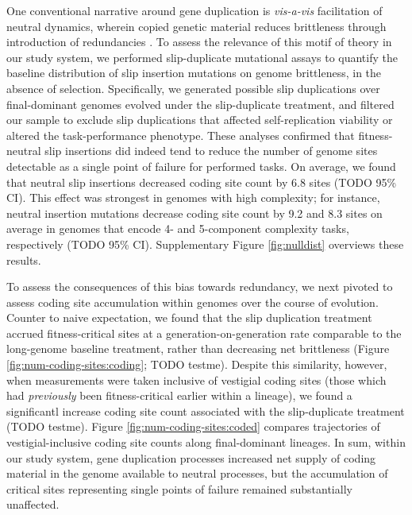 One conventional narrative around gene duplication is \textit{vis-a-vis} facilitation of neutral dynamics, wherein copied genetic material reduces brittleness through introduction of redundancies \citep{wagner1996genetic}.
To assess the relevance of this motif of theory in our study system, we performed slip-duplicate mutational assays to quantify the baseline distribution of slip insertion mutations on genome brittleness, in the absence of selection.
Specifically, we generated possible slip duplications over final-dominant genomes evolved under the slip-duplicate treatment, and filtered our sample to exclude slip duplications that affected self-replication viability or altered the task-performance phenotype.
These analyses confirmed that fitness-neutral slip insertions did indeed tend to reduce the number of genome sites detectable as a single point of failure for performed tasks.
On average, we found that neutral slip insertions decreased coding site count by 6.8 sites (TODO 95\% CI).
This effect was strongest in genomes with high complexity; for instance, neutral insertion mutations decrease coding site count by 9.2 and 8.3 sites on average in genomes that encode 4- and 5-component complexity tasks, respectively (TODO 95\% CI).
Supplementary Figure \ref{fig:nulldist} overviews these results.

To assess the consequences of this bias towards redundancy, we next pivoted to assess coding site accumulation within genomes over the course of evolution.
Counter to naive expectation, we found that the slip duplication treatment accrued fitness-critical sites at a generation-on-generation rate comparable to the long-genome baseline treatment, rather than decreasing net brittleness (Figure \ref{fig:num-coding-sites:coding}; TODO testme).
Despite this similarity, however, when measurements were taken inclusive of vestigial coding sites (those which had \textit{previously} been fitness-critical earlier within a lineage), we found a significantl increase coding site count associated with the slip-duplicate treatment (TODO testme).
Figure \ref{fig:num-coding-sites:coded} compares trajectories of vestigial-inclusive coding site counts along final-dominant lineages.
In sum, within our study system, gene duplication processes increased net supply of coding material in the genome available to neutral processes, but the accumulation of critical sites representing single points of failure remained substantially unaffected.

